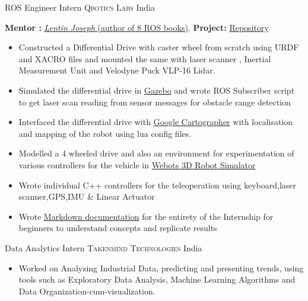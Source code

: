 \documentclass[11pt,a4paper,sans]{moderncv} %
\begin{document}
{ROS Engineer Intern}
{\textsc{Qbotics Labs}}
{India}
{}
{
    \textbf{ Mentor :} \href{https://in.linkedin.com/in/lentinjoseph}{\textit{Lentin Joseph} (author of 8 ROS books)}.
    \textbf{ Project:} \href{https://github.com/teetangh/Qbotics-Labs-Internship-Differential-Drives}{Repository}.
    \begin{itemize}
        \item{Constructed a Differential Drive with caster wheel from scratch using URDF and XACRO files and mounted the same with laser scanner , Inertial Measurement Unit and Velodyne Puck VLP-16 Lidar. }
        \item{Simulated the differential drive in \underline{Gazebo} and wrote ROS Subscriber script to get laser scan reading from sensor messages for obstacle range detection }
        \item{Interfaced the differential drive with \underline{Google Cartographer} with localisation and mapping of the robot using lua config files. }
        \item{Modelled a 4 wheeled drive and also an environment for experimentation of various controllers for the vehicle in \underline{Webots 3D Robot Simulator}}
        \item{Wrote individual C++ controllers for the teleoperation using keyboard,laser scanner,GPS,IMU \& Linear Actuator}
        \item{Wrote \underline{Markdown documentation} for the entirety of the Internship for beginners to understand concepts and replicate results}
    \end{itemize}
}




{Data Analytics Intern}
{\textsc{Takenmind Technologies}}
{India}
{}
{
    \begin{itemize}
        \item{Worked on Analyzing Industrial Data, predicting and presenting trends, using tools such as Exploratory Data Analysis, Machine Learning Algorithms and Data Organization-cum-visualization.}
    \end{itemize}
}
\end{document}
